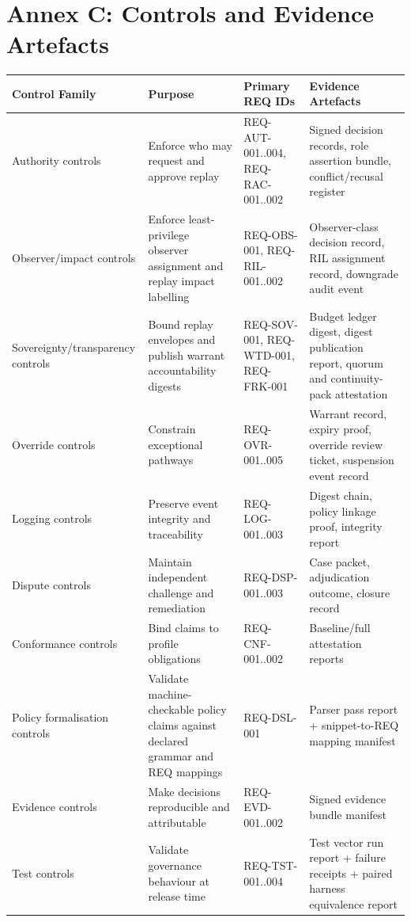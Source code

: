 \documentclass[11pt]{article}
\theoremstyle{definition}
\theoremstyle{plain}
\theoremstyle{remark}
\begin{document}
\section{Annex C: Controls and Evidence Artefacts}
\label{ann:controls}

\begin{center}
\small
\setlength{\tabcolsep}{7pt}
\renewcommand{\arraystretch}{1.22}
\begin{tabularx}{0.98\linewidth}{Y Y Y Y}
\textbf{Control Family} & \textbf{Purpose} & \textbf{Primary REQ IDs} & \textbf{Evidence Artefacts} \\ \hline
{}
Authority controls & Enforce who may request and approve replay & REQ-AUT-001..004, REQ-RAC-001..002 & Signed decision records, role assertion bundle, conflict/recusal register \\
Observer/impact controls & Enforce least-privilege observer assignment and replay impact labelling & REQ-OBS-001, REQ-RIL-001..002 & Observer-class decision record, RIL assignment record, downgrade audit event \\
Sovereignty/\allowbreak transparency controls & Bound replay envelopes and publish warrant accountability digests & REQ-SOV-001, REQ-WTD-001, REQ-FRK-001 & Budget ledger digest, digest publication report, quorum and continuity-pack attestation \\
Override controls & Constrain exceptional pathways & REQ-OVR-001..005 & Warrant record, expiry proof, override review ticket, suspension event record \\
Logging controls & Preserve event integrity and traceability & REQ-LOG-001..003 & Digest chain, policy linkage proof, integrity report \\
Dispute controls & Maintain independent challenge and remediation & REQ-DSP-001..003 & Case packet, adjudication outcome, closure record \\
Conformance controls & Bind claims to profile obligations & REQ-CNF-001..002 & Baseline/full attestation reports \\
Policy formalisation controls & Validate machine-checkable policy claims against declared grammar and REQ mappings & REQ-DSL-001 & Parser pass report + snippet-to-REQ mapping manifest \\
Evidence controls & Make decisions reproducible and attributable & REQ-EVD-001..002 & Signed evidence bundle manifest \\
Test controls & Validate governance behaviour at release time & REQ-TST-001..004 & Test vector run report + failure receipts + paired harness equivalence report \\
\end{tabularx}
\end{center}
\end{document}
